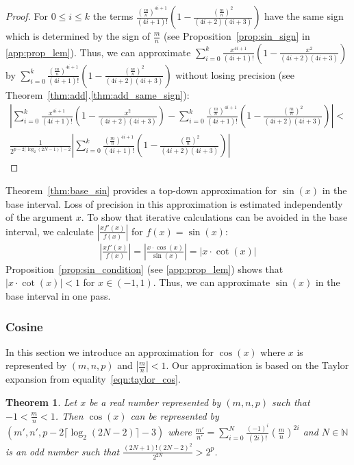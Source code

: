 \documentclass{article}
\newcommand{\nat}{\mathbb{N}}
\newtheorem{mytheorem}{Theorem}
\numberwithin{mytheorem}{section}
\newcommand{\taylorcos}[3] {\sum_{i=#1}^{#2}\frac{(-1)^i}{(2i)!}{#3}^{2i}}
\begin{document}
\begin{proof}
For $0\leq i\leq k$ the terms $\frac{(\frac{m}{n})^{4i+1}}{(4i+1)!}(1-\frac{(\frac{m}{n})^2}{(4i+2)(4i+3)})$ have the same sign which is determined by the sign of $\frac{m}{n}$ (see Proposition~\ref{prop:sin_sign} in \ref{app:prop_lem}). Thus, we can approximate $\sum_{i=0}^{k}\frac{x^{4i+1}}{(4i+1)!}(1-\frac{x^2}{(4i+2)(4i+3)})$ by $\sum_{i=0}^{k}\frac{(\frac{m}{n})^{4i+1}}{(4i+1)!}(1-\frac{(\frac{m}{n})^2}{(4i+2)(4i+3)})$ without losing precision (see Theorem~\ref{thm:add}.\ref{thm:add_same_sign}):
\begin{align*}
|\sum_{i=0}^{k}\frac{x^{4i+1}}{(4i+1)!}(1-\frac{x^2}{(4i+2)(4i+3)})-\sum_{i=0}^{k}\frac{(\frac{m}{n})^{4i+1}}{(4i+1)!}(1-\frac{(\frac{m}{n})^2}{(4i+2)(4i+3)})|<\\
\frac{1}{2^{p-2\lceil\log_2(2N-1)\rceil -2}}|\sum_{i=0}^{k}\frac{(\frac{m}{n})^{4i+1}}{(4i+1)!}(1-\frac{(\frac{m}{n})^2}{(4i+2)(4i+3)})|
\end{align*}
\end{proof}


Theorem~\ref{thm:base_sin} provides a top-down approximation for $\sin(x)$ in the base interval. Loss of precision in this approximation is estimated independently of the argument $x$. To show that iterative calculations can be avoided in the base interval, we calculate $|\frac{xf'(x)}{f(x)}|$ for $f(x)=\sin(x)$:
\begin{align}
|\frac{xf'(x)}{f(x)}|=|\frac{x\cdot \cos(x)}{\sin(x)}|=|x\cdot \cot(x)|\label{eqn:pert_sin}
\end{align}
Proposition~\ref{prop:sin_condition} (see \ref{app:prop_lem}) shows that $|x\cdot \cot(x)|<1$ for $x\in (-1,1)$. Thus, we can approximate $\sin(x)$ in the base interval in one pass. 
\subsubsection{Cosine}
\label{subsubsec:base_cos}
In this section we introduce an approximation for $\cos(x)$ where $x$ is represented by $(m,n,p)$ and $|\frac{m}{n}|<1$. Our approximation is based on the Taylor expansion from equality~\eqref{eqn:taylor_cos}.
\begin{mytheorem}\label{thm:base_cos}
Let $x$ be a real number represented by $(m,n,p)$ such that $-1<\frac{m}{n}<1$. Then $\cos(x)$ can be represented by $(m',n',p-2\lceil \log_2(2N-2) \rceil -3)$ where $\frac{m'}{n'}=\taylorcos{0}{N}{(\frac{m}{n})}$ and $N\in\nat$ is an odd number such that $\frac{(2N+1)!(2N-2)^2}{2^{2N}}>2^p$.
\end{mytheorem}
\end{document}
